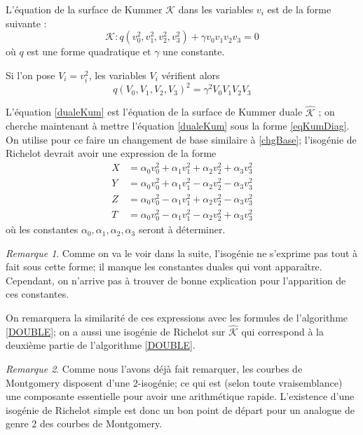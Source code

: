 \documentclass[a4paper,12pt]{article}
\theoremstyle{definition}
\theoremstyle{remark}
\newtheorem{remarque}{Remarque}
\numberwithin{equation}{section}
\begin{document}
L'équation de la surface de Kummer $\mathcal{K}$ dans les variables $v_i$ est de la forme suivante \citep{cassels-Flynn} :
\begin{equation}
\label{eqKumDiag}
\mathcal{K} : q(v_0^2,v_1^2,v_2^2,v_3^2)+\gamma v_0v_1v_2v_3 = 0
\end{equation}
où $q$ est une forme quadratique et $\gamma$ une constante.

Si l'on pose $V_i = v_i^2$, les variables $V_i$ vérifient alors
\begin{equation}
\label{dualeKum}
q(V_0,V_1,V_2,V_3)^2 = \gamma^2 V_0V_1V_2V_3
\end{equation}

L'équation \ref{dualeKum} est l'équation de la surface de Kummer duale $\hat{\mathcal{K}}$ \citep{cassels-Flynn}; on cherche maintenant à mettre l'équation \ref{dualeKum} sous la forme \ref{eqKumDiag}. On utilise pour ce faire un changement de base similaire à \ref{chgBase}; l'isogénie de Richelot devrait avoir une expression de la forme
\begin{align*}
X &= \alpha_0v_0^2+\alpha_1v_1^2+\alpha_2v_2^2+\alpha_3v_3^2 \\
Y &= \alpha_0v_0^2+\alpha_1v_1^2-\alpha_2v_2^2-\alpha_3v_3^2 \\
Z &= \alpha_0v_0^2-\alpha_1v_1^2+\alpha_2v_2^2-\alpha_3v_3^2 \\
T &= \alpha_0v_0^2-\alpha_1v_1^2-\alpha_2v_2^2+\alpha_3v_3^2
\end{align*}
où les constantes $\alpha_0,\alpha_1,\alpha_2,\alpha_3$ seront à déterminer.

\begin{remarque}
Comme on va le voir dans la suite, l'isogénie ne s'exprime pas tout à fait sous cette forme; il manque les constantes duales qui vont apparaître. Cependant, on n'arrive pas à trouver de bonne explication pour l'apparition de ces constantes.
\end{remarque}

On remarquera la similarité de ces expressions avec les formules de l'algorithme \ref{DOUBLE}; on a aussi une isogénie de Richelot sur $\hat{\mathcal{K}}$ qui correspond à la deuxième partie de l'algorithme \ref{DOUBLE}.

\begin{remarque}
Comme nous l'avons déjà fait remarquer, les courbes de Montgomery disposent d'une 2-isogénie; ce qui est (selon toute vraisemblance) une composante essentielle pour avoir une arithmétique rapide.
L'existence d'une isogénie de Richelot simple est donc un bon point de départ pour un analogue de genre 2 des courbes de Montgomery.
\end{remarque}
\end{document}
